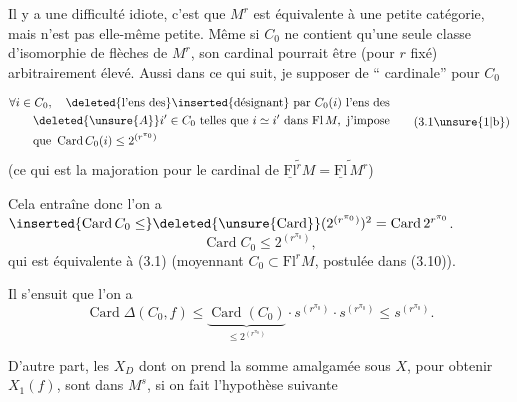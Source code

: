 Il y a une difficulté idiote, c'est que
 $M^r$ est équivalente à une petite catégorie,
mais n'est pas elle-même petite. Même si
$C_0$ ne contient qu'une seule classe d'isomorphie de flèches de $M^r$, son cardinal pourrait
être (pour $r$ fixé) arbitrairement élevé. Aussi
dans ce qui suit, je  supposer 
 
de `` cardinale'' pour $C_0$

\[
\begin{aligned}
&\forall i\in C_0,\quad\deleted{\text{l'ens des}}\inserted{\text{désignant}} \text{ par }C_0(i)\text{ l'ens des}\\
&\qquad\deleted{\unsure{A}}i'\in C_0\text{ telles que }i\simeq i'\text{ dans }\mathrm{Fl}\,M,\text{ j'impose}\\
&\qquad\text{que }\operatorname{Card}C_0(i)\leq 2^{(r^{\pi_0})}
\end{aligned}
\tag*{(3.1\unsure{1|b})}
\]
(ce qui est  la  majoration pour le cardinal de
$\widetilde{\underline{\mathrm{Fl}}^rM}=\widetilde{\underline{\mathrm{Fl}}\,M^r}$)

Cela entraîne donc  l'on a
$\inserted{\operatorname{Card}C_0\leq}\deleted{\unsure{\operatorname{Card}}}(2^{(r^{\pi_0})})^2=\operatorname{Card}2^{r^{\pi_0}}$.
\[
\operatorname{Card}C_0\leq 2^{(r^{\pi_0})},
\tag*{(3.12)}
\]
qui est équivalente à (3.1) (moyennant $C_0\subset\mathrm{Fl}^rM$,
postulée dans (3.10)).

Il s'ensuit  que l'on a
\[
\operatorname{Card}\Delta(C_0,f)\leq
\underbrace{\operatorname{Card}(C_0)}_{\leq 2^{(r^{\pi_0})}}
\mathbin{\cdot}s^{(r^{\pi_0})}\mathbin{\cdot}s^{(r^{\pi_0})}\leq s^{(r^{\pi_0})}.
\]

D'autre part, les $X_D$ dont on prend la somme
amalgamée sous $X$, pour obtenir $X_1(f)$,
sont dans $M^s$, si on fait l'hypothèse suivante

